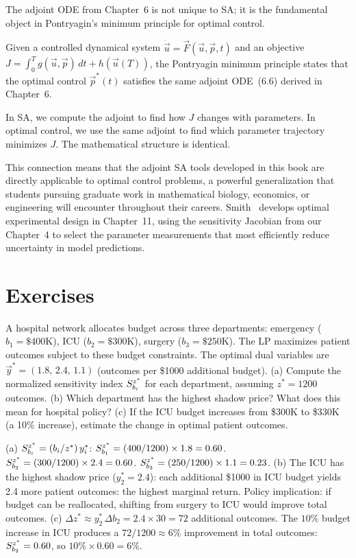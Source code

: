 The adjoint ODE from Chapter~6 is not unique to SA; it is the
fundamental object in Pontryagin's minimum principle for optimal control.

Given a controlled dynamical system $\dot{\vec{u}} = \vec{F}(\vec{u}, \vec{p}, t)$
and an objective $J = \int_0^T g(\vec{u}, \vec{p})\,dt + h(\vec{u}(T))$,
the Pontryagin minimum principle states that the optimal control $\vec{p}^*(t)$
satisfies the same adjoint ODE~(6.6) derived in Chapter~6.

In SA, we compute the adjoint to find how $J$ changes with parameters.
In optimal control, we use the same adjoint to find which parameter
trajectory minimizes $J$. The mathematical structure is identical.

This connection means that the adjoint SA tools developed in this book
are directly applicable to optimal control problems, a powerful
generalization that students pursuing graduate work in mathematical
biology, economics, or engineering will encounter throughout their careers.
Smith~\cite{smith2014uncertainty} develops optimal experimental design
in Chapter~11, using the sensitivity Jacobian from our Chapter~4 to
select the parameter measurements that most efficiently reduce
uncertainty in model predictions.

\section{Exercises}
\label{appsec:E_exercises}

\begin{selfcheck}
A hospital network allocates budget across three departments:
emergency ($b_1 = \$400$K), ICU ($b_2 = \$300$K), surgery ($b_3 = \$250$K).
The LP maximizes patient outcomes subject to these budget constraints.
The optimal dual variables are $\vec{y}^* = (1.8,\, 2.4,\, 1.1)$
(outcomes per \$1000 additional budget).
(a) Compute the normalized sensitivity index $S_{b_i}^{z^*}$ for each department,
assuming $z^* = 1200$ outcomes.
(b) Which department has the highest shadow price? What does this mean for
hospital policy?
(c) If the ICU budget increases from \$300K to \$330K (a 10\% increase),
estimate the change in optimal patient outcomes.
\end{selfcheck}
\begin{scAnswer}
(a) $S_{b_i}^{z^*} = (b_i/z^*)\,y_i^*$:
$S_{b_1}^{z^*} = (400/1200)\times1.8 = 0.60$.
$S_{b_2}^{z^*} = (300/1200)\times2.4 = 0.60$.
$S_{b_3}^{z^*} = (250/1200)\times1.1 = 0.23$.
(b) The ICU has the highest shadow price ($y_2^* = 2.4$): each additional \$1000
in ICU budget yields 2.4 more patient outcomes: the highest marginal return.
Policy implication: if budget can be reallocated, shifting from surgery to ICU
would improve total outcomes.
(c) $\Delta z^* \approx y_2^*\,\Delta b_2 = 2.4\times30 = 72$ additional outcomes.
The $10\%$ budget increase in ICU produces a $72/1200 \approx 6\%$ improvement
in total outcomes: $S_{b_2}^{z^*} = 0.60$, so $10\%\times0.60 = 6\%$. \checkmark
\end{scAnswer}

